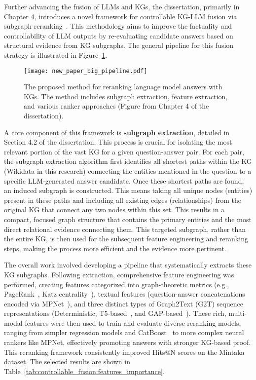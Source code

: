 Further advancing the fusion of LLMs and KGs, the dissertation, primarily in Chapter 4, introduces a novel framework for controllable KG-LLM fusion via subgraph reranking~\cite{DBLP:journals/corr/abs-2310-02166}. This methodology aims to improve the factuality and controllability of LLM outputs by re-evaluating candidate answers based on structural evidence from KG subgraphs. The general pipeline for this fusion strategy is illustrated in Figure~\ref{fig:synopsis:fusion_pipeline}.

\begin{figure}[htb]
    \centering
    \texttt{[image: new\_paper\_big\_pipeline.pdf]}
    \caption{The proposed method for reranking language model answers with KGs. The method includes subgraph extraction, feature extraction, and various ranker approaches (Figure from Chapter 4 of the dissertation).}
    \label{fig:synopsis:fusion_pipeline}
\end{figure}

A core component of this framework is \textbf{subgraph extraction}, detailed in Section 4.2 of the dissertation. This process is crucial for isolating the most relevant portion of the vast KG for a given question-answer pair. For each pair, the subgraph extraction algorithm first identifies all shortest paths within the KG (Wikidata in this research) connecting the entities mentioned in the question to a specific LLM-generated answer candidate. Once these shortest paths are found, an induced subgraph is constructed. This means taking all unique nodes (entities) present in these paths and including all existing edges (relationships) from the original KG that connect any two nodes within this set. This results in a compact, focused graph structure that contains the primary entities and the most direct relational evidence connecting them. This targeted subgraph, rather than the entire KG, is then used for the subsequent feature engineering and reranking steps, making the process more efficient and the evidence more pertinent.

The overall work involved developing a pipeline that systematically extracts these KG subgraphs. Following extraction, comprehensive feature engineering was performed, creating features categorized into graph-theoretic metrics (e.g., PageRank~\cite{page1999pagerank}, Katz centrality~\cite{katz1953new}), textual features (question-answer concatenations encoded via MPNet~\cite{DBLP:conf/nips/Song0QLL20}), and three distinct types of Graph2Text (G2T) sequence representations (Deterministic, T5-based~\cite{DBLP:journals/corr/abs-2007-08426}, and GAP-based~\cite{DBLP:conf/coling/ColasAW22-GAP}). These rich, multi-modal features were then used to train and evaluate diverse reranking models, ranging from simpler regression models and CatBoost~\cite{DBLP:conf/nips/ProkhorenkovaGV18-catboost} to more complex neural rankers like MPNet, effectively promoting answers with stronger KG-based proof. This reranking framework consistently improved Hits@N scores on the Mintaka dataset. The selected results are shown in Table~\ref{tab:controllable_fusion:features_importance}.

